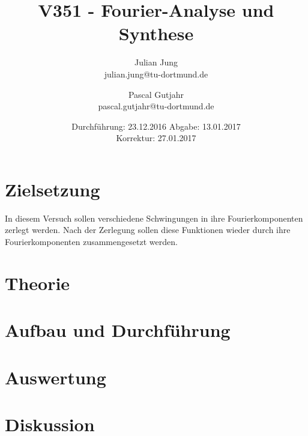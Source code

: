 

\title{V351 - Fourier-Analyse und Synthese}
\author{Julian Jung \\ julian.jung@tu-dortmund.de
  \and Pascal Gutjahr \\ pascal.gutjahr@tu-dortmund.de}
  \date{Durchführung: 23.12.2016
  \hspace{3em}
  Abgabe: 13.01.2017 \\
  Korrektur: 27.01.2017}
  
\maketitle
\newpage
\tableofcontents
\newpage
\section{Zielsetzung}
In diesem Versuch sollen verschiedene Schwingungen in ihre
Fourierkomponenten zerlegt werden. Nach der Zerlegung sollen diese Funktionen
wieder durch ihre Fourierkomponenten zusammengesetzt werden.
\section{Theorie}
 
 \newpage
\section{Aufbau und Durchführung}
 
\section{Auswertung}
 
\section{Diskussion}
 
\printbibliography

